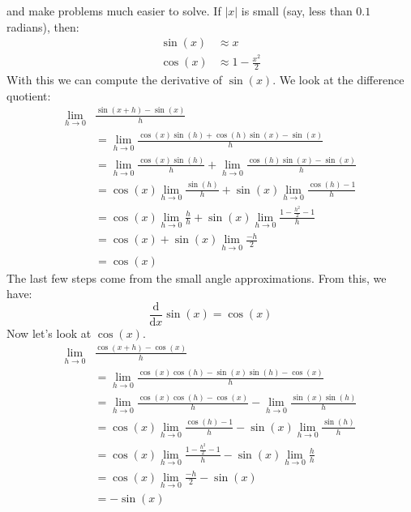 \documentclass{article}
\begin{document}
    and make problems much easier to solve. If $|x|$ is small (say, less than
    $0.1$ radians), then:
    \begin{align}
        \sin(x)&\approx{x}\\
        \cos(x)&\approx{1}-\frac{x^{2}}{2}
    \end{align}
    With this we can compute the derivative of $\sin(x)$. We look at the
    difference quotient:
    \begin{align}
        \lim_{h\rightarrow{0}}&
            \frac{\sin(x+h)-\sin(x)}{h}\nonumber\\
        &=\lim_{h\rightarrow{0}}
            \frac{\cos(x)\sin(h)+\cos(h)\sin(x)-\sin(x)}{h}\\
        &=\lim_{h\rightarrow{0}}\frac{\cos(x)\sin(h)}{h}
            +\lim_{h\rightarrow{0}}\frac{\cos(h)\sin(x)-\sin(x)}{h}\\
        &=\cos(x)\lim_{h\rightarrow{0}}\frac{\sin(h)}{h}+
            \sin(x)\lim_{h\rightarrow{0}}\frac{\cos(h)-1}{h}\\
        &=\cos(x)\lim_{h\rightarrow{0}}\frac{h}{h}
            +\sin(x)\lim_{h\rightarrow{0}}\frac{1-\frac{h^{2}}{2}-1}{h}\\
        &=\cos(x)+\sin(x)\lim_{h\rightarrow{0}}\frac{-h}{2}\\
        &=\cos(x)
    \end{align}
    The last few steps come from the small angle approximations. From this, we
    have:
    \begin{equation}
        \frac{\text{d}}{\text{d}x}\sin(x)=\cos(x)
    \end{equation}
    Now let's look at $\cos(x)$.
    \begin{align}
        \lim_{h\rightarrow{0}}&
            \frac{\cos(x+h)-\cos(x)}{h}\\
        &=\lim_{h\rightarrow{0}}
            \frac{\cos(x)\cos(h)-\sin(x)\sin(h)-\cos(x)}{h}\\
        &=\lim_{h\rightarrow{0}}\frac{\cos(x)\cos(h)-\cos(x)}{h}
            -\lim_{h\rightarrow{0}}\frac{\sin(x)\sin(h)}{h}\\
        &=\cos(x)\lim_{h\rightarrow{0}}\frac{\cos(h)-1}{h}
            -\sin(x)\lim_{h\rightarrow{0}}\frac{\sin(h)}{h}\\
        &=\cos(x)\lim_{h\rightarrow{0}}\frac{1-\frac{h^{2}}{2}-1}{h}
            -\sin(x)\lim_{h\rightarrow{0}}\frac{h}{h}\\
        &=\cos(x)\lim_{h\rightarrow{0}}\frac{-h}{2}-\sin(x)\\
        &=-\sin(x)
    \end{align}
\end{document}

